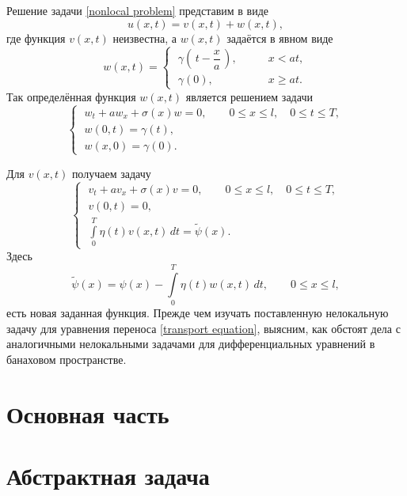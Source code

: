 \documentclass{article}
\renewcommand{\le}{\leqslant}
\renewcommand{\ge}{\geqslant}
\theoremstyle{definition}
\begin{document}
Решение задачи \eqref{nonlocal problem} представим в виде
\begin{equation*}
	u(x,t) = v(x,t) + w(x,t),
\end{equation*}
где функция $v(x,t)$ неизвестна, а $w(x,t)$ задаётся в явном виде
\begin{equation} \label{w(x,t)}
w(x,t) = 
	\begin{cases}
	\; \gamma\left(\,t - \dfrac{x}{a}\,\right), & \qquad x < at, \\[3mm]
	\; \gamma(0), & \qquad x \ge at.
	\end{cases}
\end{equation}
Так определённая функция $w(x,t)$ является решением задачи
\begin{equation*}
\begin{cases}
	\; w_t + aw_x + \sigma(x)w = 0, \qquad 0 \le x \le l, \quad 0 \le t \le T, \\[1mm]
	\; w(0,t) = \gamma(t), \\[1mm]
	\; w(x,0) = \gamma(0).
\end{cases}
\end{equation*}

Для $v(x,t)$ получаем задачу
\begin{equation*}
\begin{cases}
	\; v_t + av_x + \sigma(x)v = 0, \qquad 0 \le x \le l, \quad 0 \le t \le T, \\[3mm]
	\; v(0,t) = 0, \\[1mm]
	\; \int\limits_{0}^{T} \eta(t) v(x,t)\,dt = \widetilde{\psi}(x).
\end{cases}
\end{equation*}
Здесь 
\begin{equation*}
	\widetilde{\psi}(x) = \psi(x) - \int\limits_{0}^{T} \eta(t) w(x,t)\,dt, \qquad 0 \le x \le l,
\end{equation*}
есть новая заданная функция.
\goodbreak
Прежде чем изучать поставленную нелокальную задачу для уравнения переноса \eqref{transport equation},
выясним, как обстоят дела с аналогичными нелокальными задачами для дифференциальных уравнений в банаховом пространстве.

\newpage

\section*{Основная часть}
\section{Абстрактная задача}
\end{document}
